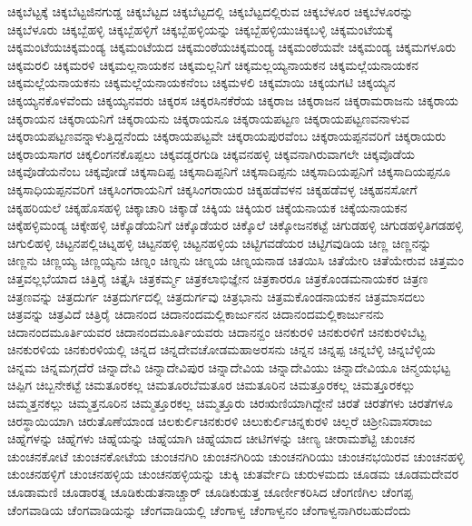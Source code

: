 {ಚಿಕ್ಕಬೆಟ್ಟಕ್ಕೆ
ಚಿಕ್ಕಬೆಟ್ಟಜಿನಗುಡ್ಡ
ಚಿಕ್ಕಬೆಟ್ಟದ
ಚಿಕ್ಕಬೆಟ್ಟದಲ್ಲಿ
ಚಿಕ್ಕಬೆಟ್ಟದಲ್ಲಿರುವ
ಚಿಕ್ಕಬೆಳೂರ
ಚಿಕ್ಕಬೆಳೂರನ್ನು
ಚಿಕ್ಕಬೆಳೂರು
ಚಿಕ್ಕಬ್ಬೆಹಳ್ಳಿ
ಚಿಕ್ಕಬ್ಬೆಹಳ್ಳಿಗೆ
ಚಿಕ್ಕಬ್ಬೆಹಳ್ಳಿಯನ್ನು
ಚಿಕ್ಕಬ್ಬೆಹಳ್ಳಿಯುಚಿಕ್ಕಬಳ್ಳಿ
ಚಿಕ್ಕಮಂಟೆಯಕ್ಕೆ
ಚಿಕ್ಕಮಂಟೆಯಚಿಕ್ಕಮಂಡ್ಯ
ಚಿಕ್ಕಮಂಟೆಯದ
ಚಿಕ್ಕಮಂಠೆಯಚಿಕ್ಕಮಂಡ್ಯ
ಚಿಕ್ಕಮಂಠೆಯವೇ
ಚಿಕ್ಕಮಂಡ್ಯ
ಚಿಕ್ಕಮಗಳೂರು
ಚಿಕ್ಕಮರಲಿ
ಚಿಕ್ಕಮರಳಿ
ಚಿಕ್ಕಮಲ್ಲನಾಯಕನ
ಚಿಕ್ಕಮಲ್ಲನಿಗೆ
ಚಿಕ್ಕಮಲ್ಲಯ್ಯನಾಯಕನ
ಚಿಕ್ಕಮಲ್ಲೆಯನಾಯಕನ
ಚಿಕ್ಕಮಲ್ಲೆಯನಾಯಕನು
ಚಿಕ್ಕಮಲ್ಲೆಯನಾಯಕನೆಂಬ
ಚಿಕ್ಕಮಳಲಿ
ಚಿಕ್ಕಮಾಯಿ
ಚಿಕ್ಕಯಗಟಿ
ಚಿಕ್ಕಯ್ಯನ
ಚಿಕ್ಕಯ್ಯನಕೊಳವೆಂದು
ಚಿಕ್ಕಯ್ಯನವರು
ಚಿಕ್ಕರಸ
ಚಿಕ್ಕರಸಿನಕೆರೆಯ
ಚಿಕ್ಕರಾಜ
ಚಿಕ್ಕರಾಜನ
ಚಿಕ್ಕರಾಮರಾಜನು
ಚಿಕ್ಕರಾಯ
ಚಿಕ್ಕರಾಯನ
ಚಿಕ್ಕರಾಯನಿಗೆ
ಚಿಕ್ಕರಾಯನು
ಚಿಕ್ಕರಾಯನೂ
ಚಿಕ್ಕರಾಯಪಟ್ಟಣ
ಚಿಕ್ಕರಾಯಪಟ್ಟಣವನಾಳುವ
ಚಿಕ್ಕರಾಯಪಟ್ಟಣವನ್ನಾಳುತ್ತಿದ್ದನೆಂದು
ಚಿಕ್ಕರಾಯಪಟ್ಟವೇ
ಚಿಕ್ಕರಾಯಪುರವೆಂಬ
ಚಿಕ್ಕರಾಯಪ್ಪನವರಿಗೆ
ಚಿಕ್ಕರಾಯರು
ಚಿಕ್ಕರಾಯಸಾಗರ
ಚಿಕ್ಕಲಿಂಗನಕೊಪ್ಪಲು
ಚಿಕ್ಕವಡ್ಡರಗುಡಿ
ಚಿಕ್ಕವನಹಳ್ಳಿ
ಚಿಕ್ಕವನಾಗಿರುವಾಗಲೇ
ಚಿಕ್ಕವೊಡೆಯ
ಚಿಕ್ಕವೊಡೆಯನೆಂಬ
ಚಿಕ್ಕವೋಡೆ
ಚಿಕ್ಕಸಾದಿಪ್ಪ
ಚಿಕ್ಕಸಾದಿಪ್ಪನಿಗೆ
ಚಿಕ್ಕಸಾದಿಪ್ಪನು
ಚಿಕ್ಕಸಾದಿಯಪ್ಪನಿಗೆ
ಚಿಕ್ಕಸಾದಿಯಪ್ಪನೂ
ಚಿಕ್ಕಸಾಧಿಯಪ್ಪನವರಿಗೆ
ಚಿಕ್ಕಸಿಂಗರಾಯನಿಗೆ
ಚಿಕ್ಕಸಿಂಗರಾಯರ
ಚಿಕ್ಕಹಡೆವಳನ
ಚಿಕ್ಕಹಡೆವಳ್ಳ
ಚಿಕ್ಕಹನಸೋಗೆ
ಚಿಕ್ಕಹರಿಯಲೆ
ಚಿಕ್ಕಹೊಸಹಳ್ಳಿ
ಚಿಕ್ಕಾಚಾರಿ
ಚಿಕ್ಕಾಡೆ
ಚಿಕ್ಕಿಯ
ಚಿಕ್ಕಿಯರ
ಚಿಕ್ಕೆಯನಾಯಕ
ಚಿಕ್ಕೆಯನಾಯಕನ
ಚಿಕ್ಕೆಹಳ್ಳಿಮಂಡ್ಯ
ಚಿಕ್ಕೇಹಳ್ಳಿ
ಚಿಕ್ಕೊಡೆಯನಿಗೆ
ಚಿಕ್ಕೊಡೆಯರ
ಚಿಕ್ಕೊಲೆ
ಚಿಕ್ಕೋಜನಕಟ್ಟೆ
ಚಿಗುಡಹಳ್ಳಿ
ಚಿಗುಡಹಳ್ಳಿತಿಗಡಹಳ್ಳಿ
ಚಿಗುಲಿಹಳ್ಳಿ
ಚಿಟ್ಟನಪಲ್ಲಿಚಿಟ್ನಹಳ್ಳಿ
ಚಿಟ್ಟನಹಳ್ಳಿ
ಚಿಟ್ಟನಹಳ್ಳಿಯ
ಚಿಟ್ಟಿಗವಡೆಯರ
ಚಿಟ್ಟಿಗವುಡಿಯ
ಚಿಣ್ಣ
ಚಿಣ್ಣನನ್ನು
ಚಿಣ್ಣನು
ಚಿಣ್ಣಯ್ಯ
ಚಿಣ್ಣಯ್ಯನು
ಚಿಣ್ನಂ
ಚಿಣ್ನನು
ಚಿಣ್ನಯ
ಚಿಣ್ನಯನಾಡ
ಚಿತಯಿಸಿ
ಚಿತೆಯೇರಿ
ಚಿತೆಯೇರುವ
ಚಿತ್ತಮಂ
ಚಿತ್ತವಲ್ಲಭೆಯಾದ
ಚಿತ್ತಿರೈ
ಚಿತ್ತೈಸಿ
ಚಿತ್ರಕರ್ಮ್ಮ
ಚಿತ್ರಕಲಾಭಿಜ್ಞೇನ
ಚಿತ್ರಕಾರರೂ
ಚಿತ್ರಕೊಂಡಮನಾಯಕರ
ಚಿತ್ರಣ
ಚಿತ್ರಣವನ್ನು
ಚಿತ್ರದುರ್ಗ
ಚಿತ್ರದುರ್ಗದಲ್ಲಿ
ಚಿತ್ರದುರ್ಗವು
ಚಿತ್ರಭಾನು
ಚಿತ್ರಮಕೊಂಡನಾಯಕನ
ಚಿತ್ರಮಾಸದಲು
ಚಿತ್ರವನ್ನು
ಚಿತ್ರವಿದೆ
ಚಿತ್ರಿರೈ
ಚಿದಾನಂದ
ಚಿದಾನಂದಮಲ್ಲಿಕಾರ್ಜುನನ
ಚಿದಾನಂದಮಲ್ಲಿಕಾರ್ಜುನನು
ಚಿದಾನಂದಮೂರ್ತಿಯವರ
ಚಿದಾನಂದಮೂರ್ತಿಯವರು
ಚಿದಾನನ್ದಂ
ಚಿನಕುರಳಿ
ಚಿನಕುರಳಿಗೆ
ಚಿನಕುರಳಿಬೆಟ್ಟ
ಚಿನಕುರಳಿಯ
ಚಿನಕುರಳಿಯಲ್ಲಿ
ಚಿನ್ನದ
ಚಿನ್ನದೇವಚೋಡಮಹಾಅರಸನು
ಚಿನ್ನನ
ಚಿನ್ನಪ್ಪ
ಚಿನ್ನಬೆಳ್ಳಿ
ಚಿನ್ನಬೆಳ್ಳಿಯ
ಚಿನ್ನಮ
ಚಿನ್ನಮಗ್ಗದೆರೆ
ಚಿನ್ನಾದೇವಿ
ಚಿನ್ನಾದೇವಿಪುರ
ಚಿನ್ನಾದೇವಿಯ
ಚಿನ್ನಾದೇವಿಯು
ಚಿನ್ನಾದೇವಿಯೂ
ಚಿನ್ಮಯಭಟ್ಟ
ಚಿಪ್ಪಿಗ
ಚಿಬ್ಬನೇಕಟ್ಟೆ
ಚಿಮತೂರಕಲ್ಲ
ಚಿಮತೂರಬೆಮತೂರ
ಚಿಮತೂರಿನ
ಚಿಮತ್ತೂರಕಲ್ಲ
ಚಿಮತ್ತೂರಕಲ್ಲು
ಚಿಮ್ಮತ್ತನಕಲ್ಲು
ಚಿಮ್ಮತ್ತನೂರಿನ
ಚಿಮ್ಮತ್ತೂರಕಲ್ಲ
ಚಿಮ್ಮತ್ತೂರು
ಚಿರಋಣಿಯಾಗಿದ್ದೇನೆ
ಚಿರತೆ
ಚಿರತೆಗಳು
ಚಿರತೆಗಳೂ
ಚಿರಸ್ಥಾಯಿಯಾಗಿ
ಚಿರುತೊಣೆಯಾಂಡ
ಚಿಲಕುರ್ಲಿಚಿನಕುರಳಿ
ಚಿಲುಕುರ್ಲಿಚಿನ್ನಕುರಳಿ
ಚಿಲ್ಲರೆ
ಚಿಶ್ರೀನಿವಾಸರಾಜು
ಚಿಹ್ನೆಗಳನ್ನು
ಚಿಹ್ನೆಗಳು
ಚಿಹ್ನೆಯನ್ನು
ಚಿಹ್ನೆಯಾಗಿ
ಚಿಹ್ನೆಯಾದ
ಚೀಟಿಗಳನ್ನು
ಚೀಣ್ಯ
ಚೀರಾಮಶೆಟ್ಟಿ
ಚುಂಚನ
ಚುಂಚನಕೋಟೆ
ಚುಂಚನಕೋಟೆಯ
ಚುಂಚನಗಿರಿ
ಚುಂಚನಗಿರಿಯ
ಚುಂಚನಗಿರಿಯು
ಚುಂಚನಭಯಿರವ
ಚುಂಚನಹಳ್ಳಿ
ಚುಂಚನಹಳ್ಳಿಗೆ
ಚುಂಚನಹಳ್ಳಿಯ
ಚುಂಚನಹಳ್ಳಿಯನ್ನು
ಚುಕ್ಕಿ
ಚುತರ್ವೇದಿ
ಚುರುಳಮದು
ಚೂಡಮ
ಚೂಡಮದೇವರ
ಚೂಡಾಮಣಿ
ಚೂಡಾರತ್ನ
ಚೂಡಿಕುಡುತನಾಚ್ಚಾರ್
ಚೂಡಿಕುಡುತ್ತ
ಚೂರ್ಣೀಕರಿಸಿದ
ಚೆಂಗಣಿಗಿಲ
ಚೆಂಗಪ್ಪ
ಚೆಂಗವಾಡಿಯ
ಚೆಂಗವಾಡಿಯನ್ನು
ಚೆಂಗವಾಡಿಯಲ್ಲಿ
ಚೆಂಗಾಳ್ವ
ಚೆಂಗಾಳ್ವನಂ
ಚೆಂಗಾಳ್ವನಾಗಿರಬಹುದೆಂದು
}
